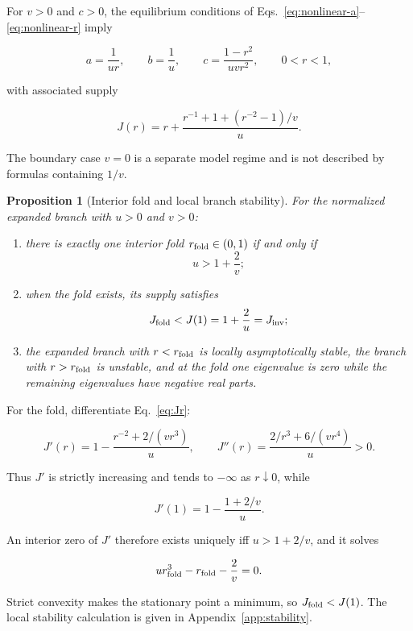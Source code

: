 \documentclass[11pt,a4paper]{article}
\newtheorem{proposition}{Proposition}
\begin{document}
For $v>0$ and $c>0$, the equilibrium conditions of Eqs.~\eqref{eq:nonlinear-a}--\eqref{eq:nonlinear-r} imply

\[
a=\frac{1}{ur},
\qquad
b=\frac{1}{u},
\qquad
c=\frac{1-r^2}{uvr^2},
\qquad
0<r<1,
\]

with associated supply

\begin{equation}
J(r)
=
r+
\frac{r^{-1}+1+(r^{-2}-1)/v}{u}.
\label{eq:Jr}
\end{equation}

The boundary case $v=0$ is a separate model regime and is not described by formulas containing $1/v$.

\begin{proposition}[Interior fold and local branch stability]
For the normalized expanded branch with $u>0$ and $v>0$:
\begin{enumerate}[label=(\roman*)]
\item there is exactly one interior fold $r_{\rm fold}\in(0,1)$ if and only if
\[
\boxed{u>1+\frac{2}{v}};
\]
\item when the fold exists, its supply satisfies
\[
J_{\rm fold}<J(1)=1+\frac{2}{u}=J_{\rm inv};
\]
\item the expanded branch with $r<r_{\rm fold}$ is locally asymptotically stable, the branch with $r>r_{\rm fold}$ is unstable, and at the fold one eigenvalue is zero while the remaining eigenvalues have negative real parts.
\end{enumerate}
\label{prop:fold-stability}
\end{proposition}

For the fold, differentiate Eq.~\eqref{eq:Jr}:

\[
J'(r)=1-\frac{r^{-2}+2/(vr^3)}{u},
\qquad
J''(r)=\frac{2/r^3+6/(vr^4)}{u}>0.
\]

Thus $J'$ is strictly increasing and tends to $-\infty$ as $r\downarrow0$, while

\[
J'(1)=1-\frac{1+2/v}{u}.
\]

An interior zero of $J'$ therefore exists uniquely iff $u>1+2/v$, and it solves

\begin{equation}
ur_{\rm fold}^3-r_{\rm fold}-\frac{2}{v}=0.
\label{eq:fold-general}
\end{equation}

Strict convexity makes the stationary point a minimum, so $J_{\rm fold}<J(1)$. The local stability calculation is given in Appendix~\ref{app:stability}.
\end{document}
